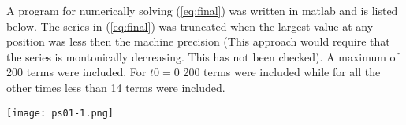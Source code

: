 \documentclass{article}
\begin{document}
A program for numerically solving  (\ref{eq:final}) was written in matlab and is listed below. The series in (\ref{eq:final}) was truncated when the largest value at any position was less then the machine precision (This approach would require that the series is montonically decreasing. This has not been checked). A maximum of 200 terms were included. For $t0=0$ 200 terms were included while for all the other times less than 14 terms were included.




\texttt{[image: ps01-1.png]}
\end{document}
